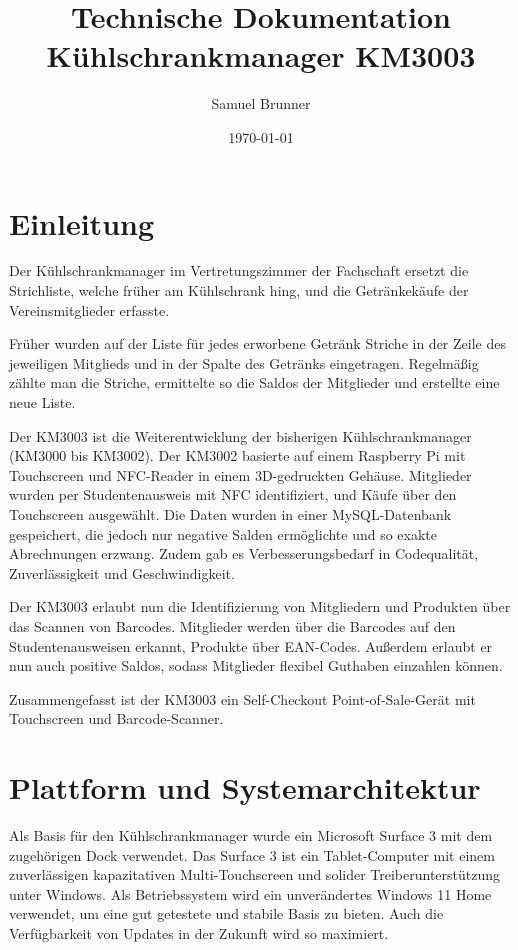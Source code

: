 \documentclass[12pt]{article}
\author{Samuel Brunner}
\date{\today}
\title{Technische Dokumentation Kühlschrankmanager KM3003}
\begin{document}
\maketitle

\newpage
\tableofcontents

\newpage

\section{Einleitung}
Der Kühlschrankmanager im Vertretungszimmer der Fachschaft ersetzt die Strichliste, welche früher am Kühlschrank hing, und die Getränkekäufe der Vereinsmitglieder erfasste.

Früher wurden auf der Liste für jedes erworbene Getränk Striche in der Zeile des jeweiligen Mitglieds und in der Spalte des Getränks eingetragen. Regelmäßig zählte man die Striche, ermittelte so die Saldos der Mitglieder und erstellte eine neue Liste.

Der KM3003 ist die Weiterentwicklung der bisherigen Kühlschrankmanager (KM3000 bis KM3002). Der KM3002 basierte auf einem Raspberry Pi mit Touchscreen und NFC-Reader in einem 3D-gedruckten Gehäuse. Mitglieder wurden per Studentenausweis mit NFC identifiziert, und Käufe über den Touchscreen ausgewählt. Die Daten wurden in einer MySQL-Datenbank gespeichert, die jedoch nur negative Salden ermöglichte und so exakte Abrechnungen erzwang. Zudem gab es Verbesserungsbedarf in Codequalität, Zuverlässigkeit und Geschwindigkeit.

Der KM3003 erlaubt nun die Identifizierung von Mitgliedern und Produkten über das Scannen von Barcodes. Mitglieder werden über die Barcodes auf den Studentenausweisen erkannt, Produkte über EAN-Codes. Außerdem erlaubt er nun auch positive Saldos, sodass Mitglieder flexibel Guthaben einzahlen können.

Zusammengefasst ist der KM3003 ein Self-Checkout Point-of-Sale-Gerät mit Touchscreen und Barcode-Scanner.

\section{Plattform und Systemarchitektur}
Als Basis für den Kühlschrankmanager wurde ein Microsoft Surface 3 mit dem zugehörigen Dock verwendet.
Das Surface 3 ist ein Tablet-Computer mit einem zuverlässigen kapazitativen Multi-Touchscreen und solider Treiberunterstützung unter Windows.
Als Betriebssystem wird ein unverändertes Windows 11 Home verwendet, um eine gut getestete und stabile Basis zu bieten. Auch die Verfügbarkeit von Updates in der Zukunft wird so maximiert.
\end{document}
